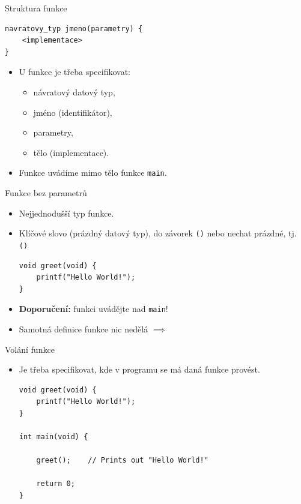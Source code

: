 \documentclass[14pt,aspectratio=169]{beamer}
\begin{document}
    \begin{frame}[t,fragile]{Struktura funkce}
        \begin{lstlisting}
navratovy_typ jmeno(parametry) {
    <implementace>
}
        \end{lstlisting}
        \begin{itemize}
            \item U funkce je třeba specifikovat:
            \begin{itemize}
                \item návratový datový typ,
                \item jméno (identifikátor),
                \item parametry,
                \item tělo (implementace).
            \end{itemize}
            \item Funkce uvádíme mimo tělo funkce \texttt{main}.
        \end{itemize}
    \end{frame}

    \begin{frame}[t,fragile]{Funkce bez parametrů}
        \begin{itemize}
            \item Nejjednodušší typ funkce.
            \item Klíčové slovo  (prázdný datový typ), do závorek \texttt{()} nebo nechat prázdné, tj. \texttt{()}
            \begin{lstlisting}
void greet(void) {
    printf("Hello World!");
}
            \end{lstlisting}
            \item \textbf{Doporučení:} funkci uvádějte nad \texttt{main}!
            \item Samotná definice funkce nic nedělá $\implies$ 
        \end{itemize}
    \end{frame}

    \begin{frame}[t,fragile]{Volání funkce}
        \begin{itemize}
            \item Je třeba specifikovat, kde v programu se má daná funkce provést.
            \begin{lstlisting}
void greet(void) {
    printf("Hello World!");
}
            
int main(void) {

    greet();    // Prints out "Hello World!"

    return 0;
}
            \end{lstlisting}
        \end{itemize}
    \end{frame}
\end{document}
